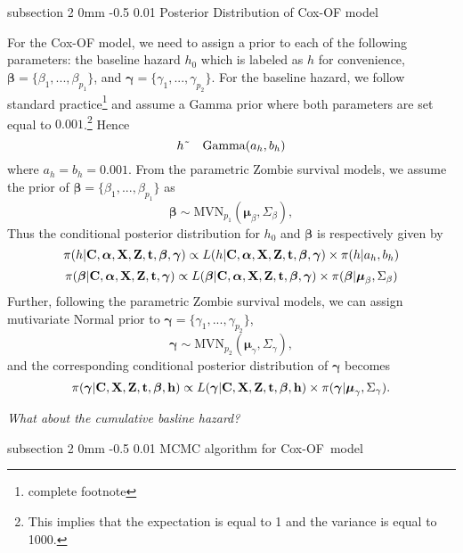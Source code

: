 \documentclass[a4paper, 12pt]{article}
\makeatletter
\renewcommand{\subsection}{\@startsection
{subsection}    {2}    {0mm}    {-0.5\baselineskip}    {0.01\baselineskip}    {\normalfont\normalsize\itshape\center}}
\makeatother
\begin{document}
\subsection{\protect\bigskip Posterior Distribution of Cox-OF model}

For the Cox-OF model, we need to assign a prior to each of the following
parameters: the baseline hazard $h_{0}$ which is labeled as $h$ for
convenience, $\mathbf{\beta }=\{\beta _{1},...,\beta _{p_{1}}\}$, and $%
\mathbf{\gamma }=\{\gamma _{1},...,\gamma _{p_{2}}\}$. For the baseline
hazard, we follow standard practice\footnote{%
complete footnote} and assume a Gamma prior where both parameters are set
equal to $0.001$.\footnote{%
This implies that the expectation is equal to 1 and the variance is equal to
1000.} Hence%
\begin{equation}
h\symbol{126}\text{ Gamma}(a_{h},b_{h})
\end{equation}%
where $a_{h}=b_{h}=0.001$. From the parametric Zombie survival models, we
assume the prior of $\mathbf{\beta }=\{\beta _{1},...,\beta _{p_{1}}\}$ as 
\begin{equation}
\mathbf{\beta }\sim \mbox{MVN}_{p_{1}}(\mathbf{\mu }_{\beta },\Sigma _{\beta
}),
\end{equation}%
Thus the conditional posterior distribution for $h_{0}$ and $\mathbf{\beta }$
is respectively given by%
\begin{equation}
\pi (h|\mathbf{C},\mathbf{\alpha },\mathbf{X},\mathbf{Z},\mathbf{t},\mathbf{%
\beta ,\gamma })\propto L(h|\mathbf{C},\mathbf{\alpha },\mathbf{X},\mathbf{Z}%
,\mathbf{t},\mathbf{\beta ,\gamma })\times \pi (h|a_{h},b_{h})
\end{equation}%
\begin{equation}
\pi (\mathbf{\beta }|\mathbf{C},\mathbf{\alpha },\mathbf{X},\mathbf{Z},%
\mathbf{t},\mathbf{\gamma })\propto L(\mathbf{\beta }|\mathbf{C},\mathbf{%
\alpha },\mathbf{X},\mathbf{Z},\mathbf{t},\mathbf{\beta ,\gamma })\times \pi
(\mathbf{\beta }|\mathbf{\mu }_{\beta },\Sigma _{\beta })
\end{equation}%
Further, following the parametric Zombie survival models, we can assign
mutivariate Normal prior to $\mathbf{\gamma }=\{\gamma _{1},...,\gamma
_{p_{2}}\}$, 
\begin{equation}
\mathbf{\gamma }\sim \mbox{MVN}_{p_{2}}(\mathbf{\mu }_{\gamma },\Sigma
_{\gamma }),
\end{equation}%
and the corresponding conditional posterior distribution of $\mathbf{\gamma }
$ becomes 
\begin{equation}
\pi (\mathbf{\gamma }|\mathbf{C},\mathbf{X},\mathbf{Z},\mathbf{t},\mathbf{%
\beta ,h})\propto L(\mathbf{\gamma }|\mathbf{C},\mathbf{X},\mathbf{Z},%
\mathbf{t},\mathbf{\beta ,h})\times \pi (\mathbf{\gamma }|\mathbf{\mu }%
_{\gamma },\Sigma _{\gamma }).
\end{equation}

\textit{What about the cumulative basline hazard? }

\subsection{MCMC algorithm for Cox-OF\ model}

\noindent
\end{document}
